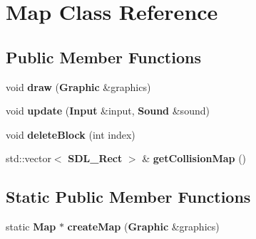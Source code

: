 \section{Map Class Reference}
\label{class_map}
\subsection*{Public Member Functions}
\begin{DoxyCompactItemize}
\item 
void {\bfseries draw} ({\bf Graphic} \&graphics)\label{class_map_a07da7aa49b7e6c2303457f06b77dfe6d}

\item 
void {\bfseries update} ({\bf Input} \&input, {\bf Sound} \&sound)\label{class_map_a9b4f56b49f490960afba683133d1e5a3}

\item 
void {\bfseries delete\+Block} (int index)\label{class_map_a2d27fba103ade6c2e812e14fccc80c7e}

\item 
std\+::vector$<$ {\bf S\+D\+L\+\_\+\+Rect} $>$ \& {\bfseries get\+Collision\+Map} ()\label{class_map_af4b9b63a7cfec5e0a868792d69a3d2e7}

\end{DoxyCompactItemize}
\subsection*{Static Public Member Functions}
\begin{DoxyCompactItemize}
\item 
static {\bf Map} $\ast$ {\bfseries create\+Map} ({\bf Graphic} \&graphics)\label{class_map_a36b46cde48bb7113ab054d3125fbca3f}

\end{DoxyCompactItemize}
